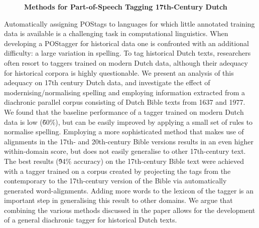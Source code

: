 \documentclass[10pt, a4paper, twopage, headinclude, footinclude, BCOR5mm]{book}
\begin{document}
\newpage

\begin{figure}[t!]
\centering
\large\textbf{Methods for Part-of-Speech Tagging 17th-Century Dutch}
\vspace*{0.5cm}
\end{figure}


\begin{table}[t!]
\end{table} 
\noindent
Automatically assigning POStags to languages for which little annotated training data is available is a challenging task in computational linguistics. When developing a POStagger for historical data one is confronted with an additional difficulty: a large variation in spelling. To tag historical Dutch texts, researchers often resort to taggers trained on modern Dutch data, although their adequacy for historical corpora is highly questionable. We present an analysis of this adequacy on 17th century Dutch data, and investigate the effect of modernising/normalising spelling and employing information extracted from a diachronic parallel corpus consisting of Dutch Bible texts from 1637 and 1977. We found that the baseline performance of a tagger trained on modern Dutch data is low (\~60\%), but can be easily improved by applying a small set of rules to normalise spelling. Employing a more sophisticated method that makes use of alignments in the 17th- and 20th-century Bible versions results in an even higher within-domain score, but does not easily generalise to other 17th-century text. The best results (\~94\% accuracy) on the 17th-century Bible text were achieved with a tagger trained on a corpus created by projecting the tags from the contemporary to the 17th-century version of the Bible via automatically generated word-alignments. Adding more words to the lexicon of the tagger is an important step in generalising this result to other domains. We argue that combining the various methods discussed in the paper allows for the development of a general diachronic tagger for historical Dutch texts.  
\end{document}
